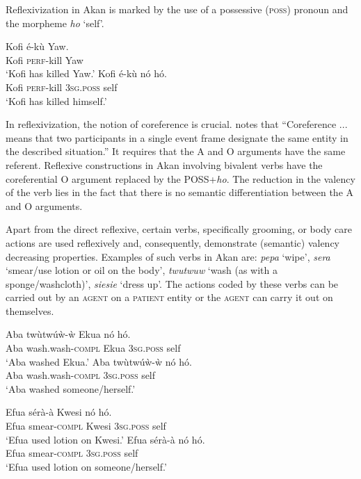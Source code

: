 \documentclass[output=paper]{langsci/langscibook}
\begin{document}
Reflexivization in Akan is marked by the use of a possessive (\textsc{poss}) pronoun and the morpheme \textit{ho} `self'.

\ea\label{ex:28.osam}
\ea\label{ex:28a.osam}
\gll   Kofi  é-kù    Yaw.\\
       Kofi  \textsc{perf}-kill  Yaw\\
\glt `Kofi has killed Yaw.'
\ex\label{ex:28b.osam}
\gll   Kofi    é-kù    nó    hó.\\
       Kofi    \textsc{perf}-kill  \textsc{3sg.poss}  self\\
\glt `Kofi has killed himself.'
\z 
\z 


In reflexivization, the notion of coreference is crucial. \citet[44]{kemmer1993} notes that ``Coreference ...  means that two participants in a single event frame designate the same entity in the described situation.''  It requires that the A and O arguments have the same referent. Reflexive constructions in Akan involving bivalent verbs have the coreferential O argument replaced by the POSS+\textit{ho}.  The reduction in the valency of the verb lies in the fact that there is no semantic differentiation between the A and O arguments. 

Apart from the direct reflexive, certain verbs, specifically grooming, or body care actions \citep{kemmer1993} are used reflexively and, consequently, demonstrate (semantic) valency decreasing properties. Examples of such verbs in Akan are: \textit{pepa} `wipe', \textit{sera} `smear/use lotion or oil on the body', \textit{twutwuw} `wash (as with a sponge/washcloth)', \textit{siesie} `dress up'. The actions coded by these verbs can be carried out by an \textsc{agent} on a \textsc{patient} entity or the \textsc{agent} can carry it out on themselves. 

\ea\label{ex:29.osam}
\ea\label{ex:29a.osam}
\gll   Aba  twùtwúẁ-ẁ    Ekua  nó    hó.\\
       Aba  wash.wash-\textsc{compl}  Ekua  \textsc{3sg.poss}  self\\
\glt   `Aba washed Ekua.'
\ex\label{ex:29b.osam}
\gll   Aba  twùtwúẁ-ẁ    nó    hó.\\
       Aba  wash.wash-\textsc{compl}  \textsc{3sg.poss}  self\\
\glt   `Aba washed someone/herself.'
\z 
\z 


\ea\label{ex:30.osam}
\ea\label{ex:30a.osam}
\gll   Efua  sérà-à    Kwesi    nó    hó.\\
       Efua  smear-\textsc{compl}  Kwesi    \textsc{3sg.poss}  self\\
\glt   `Efua used lotion on Kwesi.'
\ex\label{ex:30b.osam}
\gll    Efua  sérà-à    nó    hó.\\
       Efua  smear-\textsc{compl}  \textsc{3sg.poss}  self\\
\glt   `Efua used lotion on someone/herself.'
\z 
\z 
\end{document}

